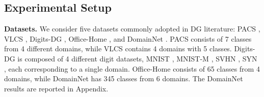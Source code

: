 \documentclass{article}
\theoremstyle{plain}
\theoremstyle{definition}
\theoremstyle{remark}
\begin{document}
\subsection{Experimental Setup}
\vspace{-1.5mm}
 \textbf{Datasets.} We consider   five datasets commonly adopted in DG literature: PACS \cite{li2017deeper}, VLCS \cite{fang2013unbiased}, Digits-DG \cite{zhou2020learning}, Office-Home \cite{venkateswara2017deep}, and DomainNet  \cite{peng2019moment}. PACS consists of 7 classes from 4 different domains, while VLCS contains 4 domains  with 5 classes. Digits-DG is composed of 4 different digit datasets, MNIST \cite{lecun1998gradient}, MNIST-M \cite{ganin2015unsupervised}, SVHN \cite{netzer2011reading}, SYN \cite{ganin2015unsupervised},  each  corresponding to a single domain. Office-Home consists of 65 classes from 4 domains, while DomainNet has  345 classes   from 6   domains. The DomainNet results are reported in Appendix.
 
 
 
 
   
\end{document}
